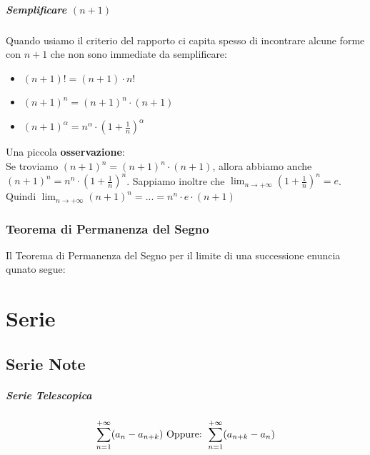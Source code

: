 \documentclass[12pt, a4paper, openany]{book}
\begin{document}
\paragraph*{Semplificare $(n+1)$}
Quando usiamo il criterio del rapporto ci capita spesso di incontrare alcune forme con $n+1$ che non sono immediate da semplificare:
\begin{itemize}
	\item $(n+1)! = (n+1) \cdot n!$
	\item $(n+1)^n = (n+1)^n \cdot (n+1)$
	\item $(n+1)^{\alpha} = n^{\alpha} \cdot (1+\frac{1}{n})^\alpha$ 
\end{itemize}
Una piccola \textbf{osservazione}:
\\Se troviamo $(n+1)^n = (n+1)^n \cdot (n+1)$, allora abbiamo anche $(n+1)^{n} = n^{n} \cdot (1+\frac{1}{n})^ n$.
Sappiamo inoltre che $\lim_{n\to +\infty}(1+\frac{1}{n})^n = e$.
\\Quindi $\lim_{n\to +\infty}(n+1)^n = ... = n^n \cdot e \cdot (n+1)$

\subsection{Teorema di Permanenza del Segno}
Il Teorema di Permanenza del Segno per il limite di una successione enuncia qunato segue:


\chapter{Serie}
\section{Serie Note}

\paragraph*{Serie Telescopica}
\begin{equation*}
	\sum_{n=1}^{+\infty} (a_n - a_{n+k})
	\text{ Oppure: }
	\sum_{n=1}^{+\infty} (a_{n+k} - a_n)
\end{equation*}
\end{document}
